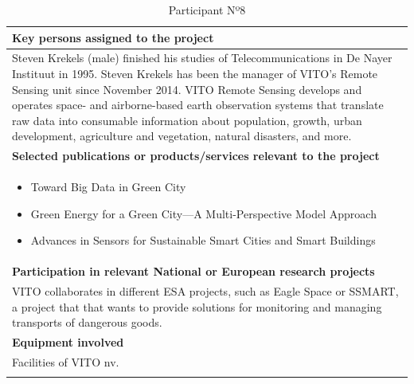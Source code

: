 \begin{longtable}[H]{|p{0.7cm}|p{4cm}|p{7cm}|p{1.3cm}|}
	\multicolumn{4}{|p{13cm}|}{\textbf{Key persons assigned to the project}}   \\ \hline
	
	\multicolumn{4}{|p{14.5cm}|}{Steven Krekels (male) finished his studies of Telecommunications in De Nayer Instituut in 1995. Steven Krekels has been the manager of VITO’s Remote Sensing unit since November 2014. VITO Remote Sensing develops and operates space- and airborne-based earth observation systems that translate raw data into consumable information about population, growth, urban development, agriculture and vegetation, natural disasters, and more.}  \\ \hline
	
	\multicolumn{4}{|p{13cm}|}{\textbf{Selected publications or products/services relevant to the project}}  \\ \hline
	
	\multicolumn{4}{|p{14.5cm}|}{
	\begin{itemize}
		\item \vspace{-0.5cm}Toward Big Data in Green City
		\item Green Energy for a Green City—A Multi-Perspective Model Approach
		\item Advances in Sensors for Sustainable Smart Cities and Smart Buildings\vspace{-0.3cm}
	\end{itemize}}  \\ \hline

	\multicolumn{4}{|p{13cm}|}{\textbf{Participation in relevant National or European research projects}}  \\ \hline
	
	\multicolumn{4}{|p{14.5cm}|}{VITO collaborates in different ESA projects, such as Eagle Space or SSMART, a project that that wants to provide solutions for monitoring and managing transports of dangerous goods.}  \\ \hline
	
	\multicolumn{4}{|p{13cm}|}{\textbf{Equipment involved}}  \\ \hline
	
	\multicolumn{4}{|p{14.5cm}|}{Facilities of VITO nv.}  \\ \hline
	\caption{Participant Nº8}
\end{longtable}
